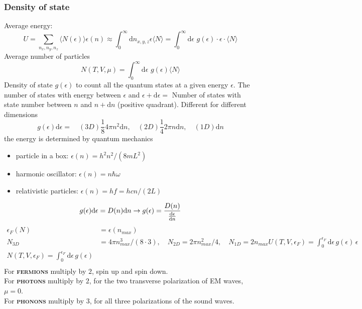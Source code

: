 \documentclass[a4paper, norsk, 8pt]{article}
\begin{document}
\begin{multicols*}{3}
\subsubsection*{\scriptsize  Density of state}
Average energy:
\begin{equation*}
  U = \sum_{n_x,n_y,n_z} \langle N(\epsilon) \rangle \epsilon(n) \approx \int_0^{\infty}\mbox{d}n_{x,y,z}\epsilon \langle N \rangle = \int_{0}^{\infty}\mbox{d}\epsilon\,\, g(\epsilon)\cdot \epsilon \cdot \langle N \rangle
\end{equation*}
Average number of particles
\begin{equation*}
  N(T,V,\mu) = \int_0^{\infty} \mbox{d}\epsilon\,\, g(\epsilon) \langle N \rangle
\end{equation*}
Density of state $g(\epsilon)$ to count all the quantum states at a given energy $\epsilon$. The number of states with energy between $\epsilon$ and $\epsilon + \mbox{d}\epsilon = $ Number of states with state number between $n$ and $n+\mbox{d}n$ (positive quadrant). Different for different dimensions
\begin{equation*}
  \boxed{g(\epsilon) \mbox{d}\epsilon=} \quad(3D) \frac{1}{8}4\pi n^2 \mbox{d}n, \quad(2D) \frac{1}{4}2\pi n \mbox{d}n, \quad(1D)\mbox{d}n
\end{equation*}
the energy is determined by quantum mechanics
\begin{itemize}
  \item particle in a box: $\epsilon(n) = h^2n^2/(8mL^2)$
  \item harmonic oscillator: $\epsilon(n) = n\hbar\omega$
  \item relativistic particles: $\epsilon(n) = hf = hcn/(2L)$
\end{itemize}
\begin{equation*}
    g(\epsilon)\mbox{d}\epsilon = D(n)\mbox{d}n \rightarrow g(\epsilon) = \frac{D(n)}{\dv{\epsilon}{n}}
\end{equation*}
\begin{align*}
  \epsilon_F(N) &= \epsilon(n_{max}) \\
  N_{3D} &= 4\pi n_{max}^3/(8\cdot 3), \quad N_{2D} = 2\pi n_{max}^2/4, \quad N_{1D} = 2n_{max}
  U(T,V,\epsilon_F) = \int_0^{\epsilon_F} \mbox{d}\epsilon \, g(\epsilon)\, \epsilon \\
  N(T,V,\epsilon_F) = \int_0^{\epsilon_F} \mbox{d}\epsilon \, g(\epsilon) \\

\end{align*}
For \textbf{\textsc{fermions}} multiply by $2$, spin up and spin down.\\
For \textbf{\textsc{photons}} multiply by $2$, for the two transverse polarization of EM waves, $\mu=0$.\\
For \textbf{\textsc{phonons}} multiply by $3$, for all three polarizations of the sound waves.


\end{multicols*}
\end{document}
